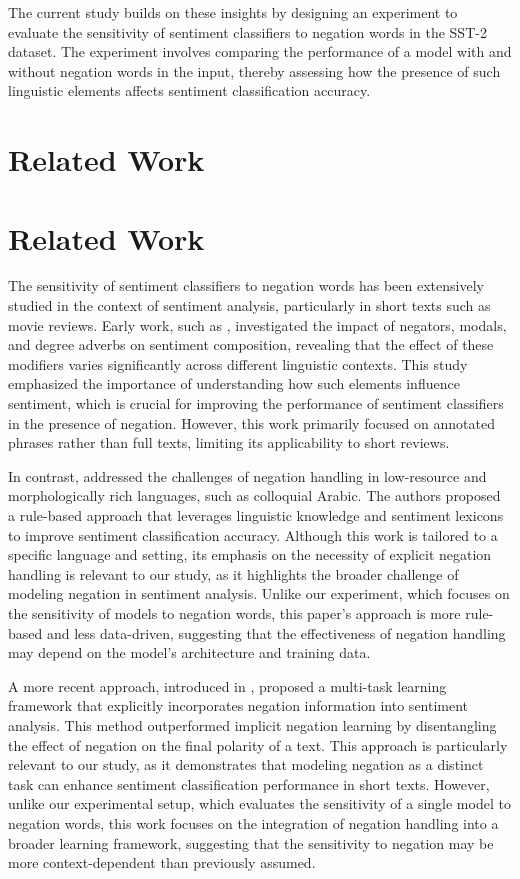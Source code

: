 \documentclass{article}
\begin{document}
The current study builds on these insights by designing an experiment to evaluate the sensitivity of sentiment classifiers to negation words in the SST-2 dataset. The experiment involves comparing the performance of a model with and without negation words in the input, thereby assessing how the presence of such linguistic elements affects sentiment classification accuracy.
\section{Related Work}
\section*{Related Work}

The sensitivity of sentiment classifiers to negation words has been extensively studied in the context of sentiment analysis, particularly in short texts such as movie reviews. Early work, such as \cite{1712.01794v1}, investigated the impact of negators, modals, and degree adverbs on sentiment composition, revealing that the effect of these modifiers varies significantly across different linguistic contexts. This study emphasized the importance of understanding how such elements influence sentiment, which is crucial for improving the performance of sentiment classifiers in the presence of negation. However, this work primarily focused on annotated phrases rather than full texts, limiting its applicability to short reviews.

In contrast, \cite{2107.11597v1} addressed the challenges of negation handling in low-resource and morphologically rich languages, such as colloquial Arabic. The authors proposed a rule-based approach that leverages linguistic knowledge and sentiment lexicons to improve sentiment classification accuracy. Although this work is tailored to a specific language and setting, its emphasis on the necessity of explicit negation handling is relevant to our study, as it highlights the broader challenge of modeling negation in sentiment analysis. Unlike our experiment, which focuses on the sensitivity of models to negation words, this paper's approach is more rule-based and less data-driven, suggesting that the effectiveness of negation handling may depend on the model's architecture and training data.

A more recent approach, introduced in \cite{1906.07610v2}, proposed a multi-task learning framework that explicitly incorporates negation information into sentiment analysis. This method outperformed implicit negation learning by disentangling the effect of negation on the final polarity of a text. This approach is particularly relevant to our study, as it demonstrates that modeling negation as a distinct task can enhance sentiment classification performance in short texts. However, unlike our experimental setup, which evaluates the sensitivity of a single model to negation words, this work focuses on the integration of negation handling into a broader learning framework, suggesting that the sensitivity to negation may be more context-dependent than previously assumed.
\end{document}
